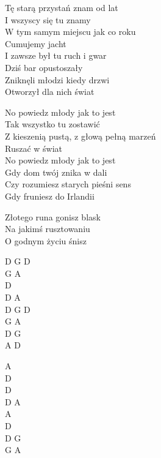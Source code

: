 \begin{text}
    Tę starą przystań znam od lat\\
    I wszyscy się tu znamy\\
    W tym samym miejscu jak co roku\\
    Cumujemy jacht\\
    I zawsze był tu ruch i gwar\\
    Dziś bar opustoszały\\
    Zniknęli młodzi kiedy drzwi\\
    Otworzył dla nich świat

    No powiedz młody jak to jest\\
    Tak wszystko tu zostawić\\
    Z kieszenią pustą, z głową pełną marzeń\\
    Ruszać w świat\\
    No powiedz młody jak to jest\\
    Gdy dom twój znika w dali\\
    Czy rozumiesz starych pieśni sens\\
    Gdy fruniesz do Irlandii

    Złotego runa gonisz blask\\
    Na jakimś rusztowaniu\\
    O godnym życiu śnisz
\end{text}
\begin{chord}
    D G D\\
    G A\\
    D\\
    D A\\
    D G D\\
    G A\\
    D G\\
    A D

    A\\
    D\\
    D\\
    D A\\
    A\\
    D\\
    D G\\
    G A
\end{chord}